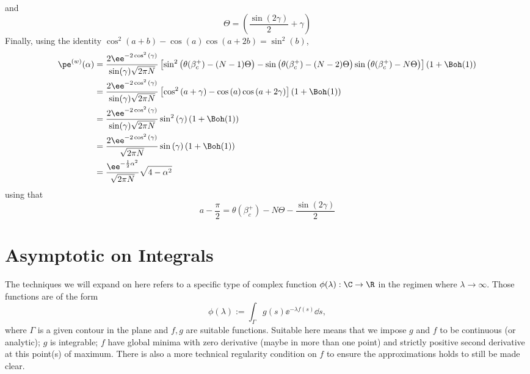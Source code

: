 {\begin{align}
\end{align} 
and
\begin{equation}
	\Theta = \left(\frac{\sin{(2\gamma)}}{2}+\gamma\right)
\end{equation}
Finally, using the identity $\cos^2(a + b) - \cos(a)\cos(a+2b) = \sin^2(b)$,
\begin{align}
	\pe^{(w)}(\alpha) & =  \frac{2 \ee^{-2\cos^2{(\gamma)}}}{\sin(\gamma) \sqrt{2\pi N}} \left[\sin^2{\left(\theta(\beta_c^+)-(N-1)\Theta \right)} - \sin{\left(\theta(\beta_c^+)-(N-2)\Theta\right)}  \sin{\left(\theta(\beta_c^+)-N\Theta \right)} \right] \left(1 + \Boh(1) \right) \\
	& =  \frac{2 \ee^{-2\cos^2{(\gamma)}}}{\sin(\gamma) \sqrt{2\pi N}} \left[\cos^2{\left(a + \gamma \right)} - \cos{\left( a \right)} \cos{\left(a + 2\gamma \right)}  \right] \left(1 + \Boh(1) \right) \\
	& =  \frac{2 \ee^{-2\cos^2{(\gamma)}}}{\sin(\gamma) \sqrt{2\pi N}} \sin^2{(\gamma)} \left(1 + \Boh(1) \right) \\
	& = \frac{2 \ee^{-2\cos^2{(\gamma)}}}{ \sqrt{2\pi N}} \sin{(\gamma)} \left(1 + \Boh(1) \right) \\
	& = \frac{\ee^{-\frac{1}{2}\alpha^2}}{\sqrt{2\pi N}} \sqrt{4 - \alpha^2}
\end{align}
using that
\begin{equation}
	a - \frac{\pi}{2} = \theta(\beta_c^+) - N \Theta - \frac{\sin{(2\gamma)}}{2}
\end{equation}
}

\section{Asymptotic on Integrals}

The techniques we will expand on here refers to a specific type of complex function $\phi(\lambda): \C \rightarrow \R$ in the regimen where $\lambda \rightarrow \infty$. Those functions are of the form 
\begin{equation}
	\phi(\lambda) := \int_{\Gamma} g(s) \ee^{-\lambda f(s)} \dd s,
	\label{Equation: Integral form phi}
\end{equation}
where $\Gamma$ is a given contour in the plane and $f, g$ are suitable functions. Suitable here means that we impose $g$ and $f$ to be continuous (or analytic); $g$ is integrable; $f$ have global minima with zero derivative (maybe in more than one point) and strictly positive second derivative at this point(s) of maximum. There is also a more technical regularity condition on $f$ to ensure the approximations holds to still be made clear.

